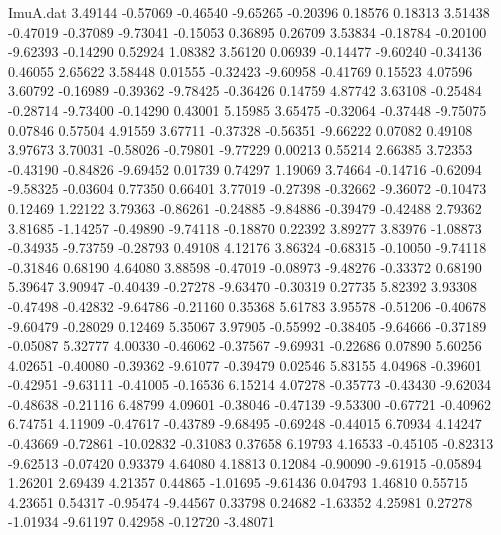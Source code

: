 \begin{filecontents}{ImuA.dat}
   3.49144   -0.57069   -0.46540   -9.65265   -0.20396    0.18576    0.18313
   3.51438   -0.47019   -0.37089   -9.73041   -0.15053    0.36895    0.26709
   3.53834   -0.18784   -0.20100   -9.62393   -0.14290    0.52924    1.08382
   3.56120    0.06939   -0.14477   -9.60240   -0.34136    0.46055    2.65622
   3.58448    0.01555   -0.32423   -9.60958   -0.41769    0.15523    4.07596
   3.60792   -0.16989   -0.39362   -9.78425   -0.36426    0.14759    4.87742
   3.63108   -0.25484   -0.28714   -9.73400   -0.14290    0.43001    5.15985
   3.65475   -0.32064   -0.37448   -9.75075    0.07846    0.57504    4.91559
   3.67711   -0.37328   -0.56351   -9.66222    0.07082    0.49108    3.97673
   3.70031   -0.58026   -0.79801   -9.77229    0.00213    0.55214    2.66385
   3.72353   -0.43190   -0.84826   -9.69452    0.01739    0.74297    1.19069
   3.74664   -0.14716   -0.62094   -9.58325   -0.03604    0.77350    0.66401
   3.77019   -0.27398   -0.32662   -9.36072   -0.10473    0.12469    1.22122
   3.79363   -0.86261   -0.24885   -9.84886   -0.39479   -0.42488    2.79362
   3.81685   -1.14257   -0.49890   -9.74118   -0.18870    0.22392    3.89277
   3.83976   -1.08873   -0.34935   -9.73759   -0.28793    0.49108    4.12176
   3.86324   -0.68315   -0.10050   -9.74118   -0.31846    0.68190    4.64080
   3.88598   -0.47019   -0.08973   -9.48276   -0.33372    0.68190    5.39647
   3.90947   -0.40439   -0.27278   -9.63470   -0.30319    0.27735    5.82392
   3.93308   -0.47498   -0.42832   -9.64786   -0.21160    0.35368    5.61783
   3.95578   -0.51206   -0.40678   -9.60479   -0.28029    0.12469    5.35067
   3.97905   -0.55992   -0.38405   -9.64666   -0.37189   -0.05087    5.32777
   4.00330   -0.46062   -0.37567   -9.69931   -0.22686    0.07890    5.60256
   4.02651   -0.40080   -0.39362   -9.61077   -0.39479    0.02546    5.83155
   4.04968   -0.39601   -0.42951   -9.63111   -0.41005   -0.16536    6.15214
   4.07278   -0.35773   -0.43430   -9.62034   -0.48638   -0.21116    6.48799
   4.09601   -0.38046   -0.47139   -9.53300   -0.67721   -0.40962    6.74751
   4.11909   -0.47617   -0.43789   -9.68495   -0.69248   -0.44015    6.70934
   4.14247   -0.43669   -0.72861  -10.02832   -0.31083    0.37658    6.19793
   4.16533   -0.45105   -0.82313   -9.62513   -0.07420    0.93379    4.64080
   4.18813    0.12084   -0.90090   -9.61915   -0.05894    1.26201    2.69439
   4.21357    0.44865   -1.01695   -9.61436    0.04793    1.46810    0.55715
   4.23651    0.54317   -0.95474   -9.44567    0.33798    0.24682   -1.63352
   4.25981    0.27278   -1.01934   -9.61197    0.42958   -0.12720   -3.48071

\end{filecontents}
